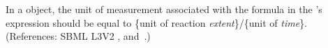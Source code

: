 In a \KineticLaw object, the unit of measurement associated with the
formula in the \KineticLaw's  expression should be equal to
\{unit of reaction \emph{extent}\}/\{unit of \emph{time}\}.  (References:
SBML L3V2 , 
and~.)
